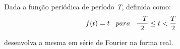 \linespread{1.5}
Dada a função periódica de período \textit{T}, definida como:
\begin{equation*}
    f(t) = t \hspace{0.3cm} para \hspace{0.3cm} \frac{-T}{2} \leq t < \frac{T}{2}
\end{equation*}

desenvolva a mesma em série de Fourier na forma real.